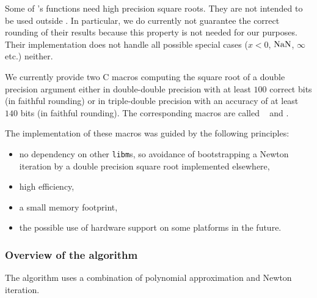 Some of \crlibm's functions need high precision square roots.  They
are not intended to be used outside \crlibm. In particular, we do
currently not guarantee the correct rounding of their results because
this property is not needed for our purposes. Their implementation
does not handle all possible special cases ($x < 0$, $\mathrm{NaN}$, $\infty$
etc.) neither.

We currently provide two C macros computing the square root of a
double precision argument either in double-double precision with at
least $100$ correct bits (in faithful rounding) or in triple-double
precision with an accuracy of at least $140$ bits (in faithful
rounding). The corresponding macros are called \SqrtD~ and
\SqrtT.

The implementation of these macros was guided by the following
principles:
\begin{itemize}
\item no dependency on other \texttt{libm}s, so avoidance of
bootstrapping a Newton iteration by a double precision square root
implemented elsewhere,
\item high efficiency,
\item a small memory footprint,
\item the possible use of hardware support on some platforms in the
future.
\end{itemize}
\subsubsection{Overview of the algorithm}
The algorithm uses a combination of polynomial approximation and
Newton iteration.

